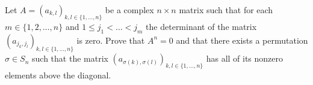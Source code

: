 Let \(A=(a_{k, l})_{k, l \in \{1, \dots, n\}}\) be a complex \(n \times n\) matrix such that for each \(m \in \{1,2,\dots,n\}\) and \(1 \leq  j_{1} <\dots<j_{m}\) the determinant of the matrix \((a_{j_{k}, j_{l}})_{k, l \in \{1, \dots, n\}}\) is zero. Prove that \(A^{n}=0\) and that there exists a permutation \(\sigma \in S_{n}\) such that the matrix \((a_{\sigma(k), \sigma(l)})_{k, l \in \{1, \dots, n\}}\) has all of its nonzero elements above the diagonal.